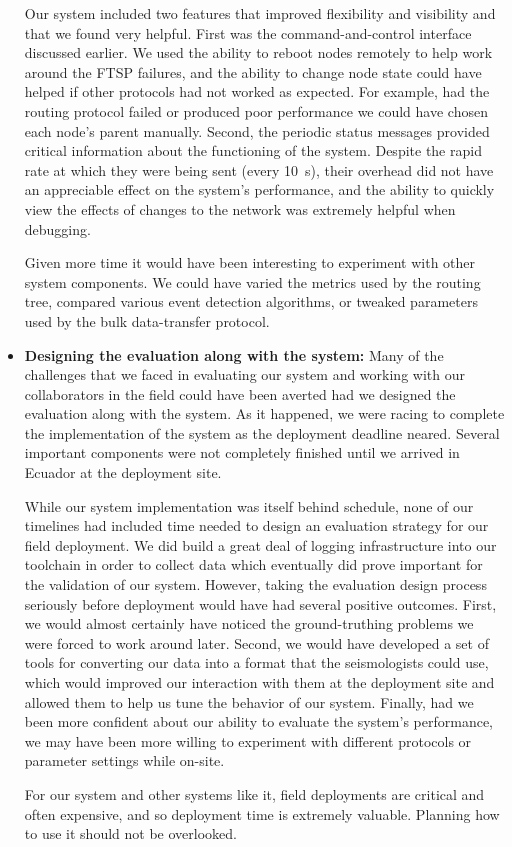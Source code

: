 \begin{itemize}
\hspace{0.25in} Our system included two features that improved flexibility
and visibility and that we found very helpful. First was the
command-and-control interface discussed earlier. We used the ability to
reboot nodes remotely to help work around the FTSP failures, and the ability
to change node state could have helped if other protocols had not worked as
expected. For example, had the routing protocol failed or produced poor
performance we could have chosen each node's parent manually. Second, the
periodic status messages provided critical information about the functioning
of the system. Despite the rapid rate at which they were being sent (every
10~s), their overhead did not have an appreciable effect on the system's
performance, and the ability to quickly view the effects of changes to the
network was extremely helpful when debugging.

\hspace{0.25in} Given more time it would have been interesting to experiment
with other system components. We could have varied the metrics used by the
routing tree, compared various event detection algorithms, or tweaked
parameters used by the bulk data-transfer protocol.

\item \textbf{Designing the evaluation along with the system:} Many of the
challenges that we faced in evaluating our system and working with our
collaborators in the field could have been averted had we designed the
evaluation along with the system. As it happened, we were racing to complete
the implementation of the system as the deployment deadline neared. Several
important components were not completely finished until we arrived in Ecuador
at the deployment site.

\hspace{0.25in} While our system implementation was itself behind schedule,
none of our timelines had included time needed to design an evaluation
strategy for our field deployment. We did build a great deal of logging
infrastructure into our toolchain in order to collect data which eventually
did prove important for the validation of our system. However, taking the
evaluation design process seriously before deployment would have had several
positive outcomes. First, we would almost certainly have noticed the
ground-truthing problems we were forced to work around later. Second, we
would have developed a set of tools for converting our data into a format
that the seismologists could use, which would improved our interaction with
them at the deployment site and allowed them to help us tune the behavior of
our system. Finally, had we been more confident about our ability to evaluate
the system's performance, we may have been more willing to experiment with
different protocols or parameter settings while on-site.

\hspace{0.25in} For our system and other systems like it, field deployments
are critical and often expensive, and so deployment time is extremely
valuable. Planning how to use it should not be overlooked.

\end{itemize}

